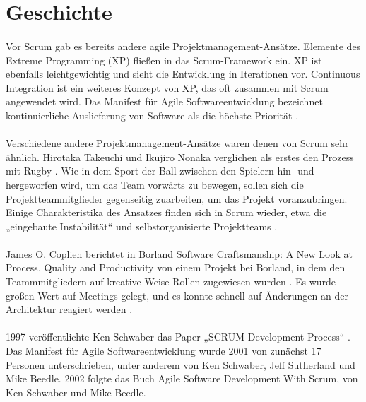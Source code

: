 \documentclass{article}
\begin{document}
\section{Geschichte}
\paragraph{}
Vor Scrum gab es bereits andere agile Projektmanagement-Ansätze. Elemente des Extreme Programming (XP) \cite{beck} fließen in das Scrum-Framework ein. XP ist ebenfalls leichtgewichtig und sieht die Entwicklung in Iterationen vor. Continuous Integration ist ein weiteres Konzept von XP, das oft zusammen mit Scrum angewendet wird. Das Manifest für Agile Softwareentwicklung bezeichnet kontinuierliche Auslieferung von Software als die höchste Priorität \cite{manifesto}.

\paragraph{}
Verschiedene andere Projektmanagement-Ansätze waren denen von Scrum sehr ähnlich. Hirotaka Takeuchi und Ikujiro Nonaka verglichen als erstes den Prozess mit Rugby \cite[S.~1]{takeuchi}. Wie in dem Sport der Ball zwischen den Spielern hin- und hergeworfen wird, um das Team vorwärts zu bewegen, sollen sich die Projektteammitglieder gegenseitig zuarbeiten, um das Projekt voranzubringen. Einige Charakteristika des Ansatzes finden sich in Scrum wieder, etwa die „eingebaute Instabilität“ und selbstorganisierte Projektteams \cite[S.~4]{takeuchi}.

\paragraph{}
James O. Coplien berichtet in \glqq Borland Software Craftsmanship: A New Look at Process, Quality and Productivity\grqq{} von einem Projekt bei Borland, in dem den Teammmitgliedern auf kreative Weise Rollen zugewiesen wurden \cite[S.~3]{coplien}. Es wurde großen Wert auf Meetings gelegt, und es konnte schnell auf Änderungen an der Architektur reagiert werden \cite[S.~7]{coplien}.

\paragraph{}
1997 veröffentlichte Ken Schwaber das Paper „SCRUM Development Process“ \cite{schwaber}. Das Manifest für Agile Softwareentwicklung wurde 2001 von zunächst 17 Personen unterschrieben, unter anderem von Ken Schwaber, Jeff Sutherland und Mike Beedle. 2002 folgte das Buch \glqq Agile Software Development With Scrum\grqq{}, von Ken Schwaber und Mike Beedle.
\end{document}
